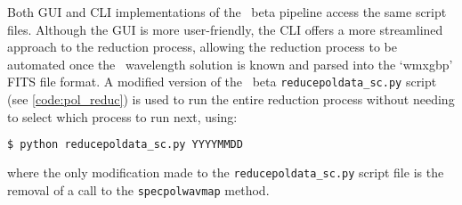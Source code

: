 Both \gls{GUI} and \gls{CLI} implementations of the \polsalt\ beta pipeline access the same script files. Although the \gls{GUI} is more user-friendly, the \gls{CLI} offers a more streamlined approach to the reduction process, allowing the reduction process to be automated once the \iraf\ wavelength solution is known and parsed into the `wmxgbp' \gls{FITS} file format. A modified version of the \polsalt\ beta \texttt{reducepoldata\_sc.py} script (see \autoref{code:pol_reduc}) is used to run the entire reduction process without needing to select which process to run next, using:
\begin{lstlisting}[language=bash]
$ python reducepoldata_sc.py YYYYMMDD
\end{lstlisting}
{\parskip=0pt where} the only modification made to the \texttt{reducepoldata\_sc.py} script file is the removal of a call to the \texttt{specpolwavmap} method.

